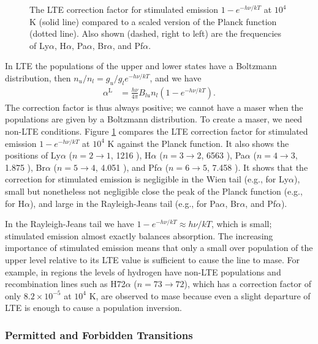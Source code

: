 \begin{figure}
\centering

\caption{The LTE correction factor for stimulated emission $1 -
e^{-h\nu/kT}$ at $10^4$ K (solid line) compared to a scaled
version of the Planck function (dotted line). Also shown (dashed, right to left) are
the frequencies of Ly$\alpha$, H$\alpha$, Pa$\alpha$,
Br$\alpha$, and Pf$\alpha$.}
\label{figure-stimulated-emssion}
\end{figure}

In LTE the populations of the upper and lower states have a
Boltzmann distribution, then $n_u / n_l = g_u/g_l
e^{-h\nu/kT}$, and we have
\begin{align}
\alpha^\mathrm{L} &= \frac{h\nu}{4\pi} B_{lu} n_l 
(1 - e^{-h\nu/kT}).
\end{align}
The correction factor is thus always positive; we cannot
have a maser when the populations are given by a Boltzmann
distribution. To create a maser, we need non-LTE conditions.
Figure \ref{figure-stimulated-emssion} compares the LTE
correction factor for stimulated emission $1 - e^{-h\nu/kT}$
at $10^4$ K against the Planck function. It also shows the
positions of Ly$\alpha$ ($n = 2\rightarrow1$, 1216 {\Angstrom}),
H$\alpha$ ($n=3\rightarrow2$, 6563 {\Angstrom}), Pa$\alpha$
($n=4\rightarrow3$, 1.875 {\micron}), Br$\alpha$ ($n=5\rightarrow4$, 4.051
{\micron}), and Pf$\alpha$ ($n=6\rightarrow5$, 7.458 {\micron}). It
shows that the correction for stimulated emission is
negligible in the Wien tail (e.g., for Ly$\alpha$), small
but nonetheless not negligible close the peak of the Planck
function (e.g., for H$\alpha$), and large in the
Rayleigh-Jeans tail (e.g., for Pa$\alpha$, Br$\alpha$, and
Pf$\alpha$).

In the Rayleigh-Jeans tail we have $1 - e^{-h\nu/kT} \approx
h\nu/kT$, which is small; stimulated emission almost exactly
balances absorption. The increasing importance of stimulated
emission means that only a small
over population of the upper level relative to its LTE value
is sufficient to cause the line to mase. For example, in
 regions the levels of hydrogen have non-LTE
populations and recombination lines such as H72$\alpha$
($n=73\rightarrow72$), which has a correction factor of only $8.2\times10^{-5}$ at $10^4$ K, are
observed to mase because even a slight departure of LTE is
enough to cause a population inversion.

\subsubsection{Permitted and Forbidden Transitions}

